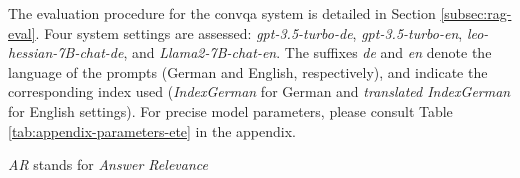 The evaluation procedure for the \gls{convqa} system is detailed in Section \ref{subsec:rag-eval}. Four system settings are assessed: \textit{gpt-3.5-turbo-de}, \textit{gpt-3.5-turbo-en}, \textit{leo-hessian-7B-chat-de}, and \textit{Llama2-7B-chat-en}. The suffixes \textit{de} and \textit{en} denote the language of the prompts (German and English, respectively), and indicate the corresponding index used (\textit{IndexGerman} for German and \textit{translated IndexGerman} for English settings). For precise model parameters, please consult Table \ref{tab:appendix-parameters-ete} in the appendix.

\begin{table}[h]
    \centering
    {\raggedright\footnotesize * \textit{AR} stands for \textit{Answer Relevance}\par}
    \caption{Answer Relevance per Model, Language and Question Type}
    \label{tab:answer-relevance-per-model}
\end{table}

